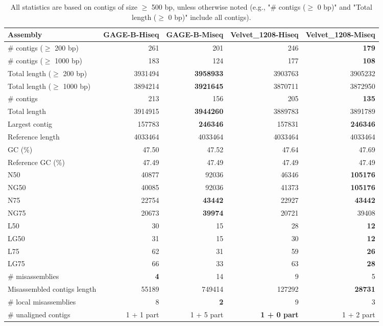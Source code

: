\documentclass[12pt,a4paper]{article}
\begin{document}
\begin{table}[ht]
\begin{center}
\caption{All statistics are based on contigs of size $\geq$ 500 bp, unless otherwise noted (e.g., "\# contigs ($\geq$ 0 bp)" and "Total length ($\geq$ 0 bp)" include all contigs).}
\begin{tabular}{|l*{4}{|r}|}
\hline
Assembly & GAGE-B-Hiseq & GAGE-B-Miseq & Velvet\_1208-Hiseq & Velvet\_1208-Miseq \\ \hline
\# contigs ($\geq$ 200 bp) & 261 & 201 & 246 & {\bf 179} \\ \hline
\# contigs ($\geq$ 1000 bp) & 183 & 124 & 177 & {\bf 108} \\ \hline
Total length ($\geq$ 200 bp) & 3931494 & {\bf 3958933} & 3903763 & 3905232 \\ \hline
Total length ($\geq$ 1000 bp) & 3894214 & {\bf 3921645} & 3870711 & 3872950 \\ \hline
\# contigs & 213 & 156 & 205 & {\bf 135} \\ \hline
Total length & 3914915 & {\bf 3944260} & 3889783 & 3891789 \\ \hline
Largest contig & 157783 & {\bf 246346} & 157831 & {\bf 246346} \\ \hline
Reference length & 4033464 & 4033464 & 4033464 & 4033464 \\ \hline
GC (\%) & 47.50 & 47.52 & 47.64 & 47.69 \\ \hline
Reference GC (\%) & 47.49 & 47.49 & 47.49 & 47.49 \\ \hline
N50 & 40877 & 92036 & 46346 & {\bf 105176} \\ \hline
NG50 & 40085 & 92036 & 41373 & {\bf 105176} \\ \hline
N75 & 22754 & {\bf 43442} & 22927 & {\bf 43442} \\ \hline
NG75 & 20673 & {\bf 39974} & 20721 & 39408 \\ \hline
L50 & 30 & 15 & 28 & {\bf 12} \\ \hline
LG50 & 31 & 15 & 30 & {\bf 12} \\ \hline
L75 & 62 & 31 & 59 & {\bf 26} \\ \hline
LG75 & 66 & 33 & 63 & {\bf 28} \\ \hline
\# misassemblies & {\bf 4} & 14 & 9 & 5 \\ \hline
Misassembled contigs length & 55189 & 749414 & 127292 & {\bf 28731} \\ \hline
\# local misassemblies & 8 & {\bf 2} & 9 & 3 \\ \hline
\# unaligned contigs & 1 + 1 part & 1 + 5 part & {\bf 1 + 0 part} & 1 + 2 part \\ \hline

\end{tabular}
\end{center}
\end{table}
\end{document}
